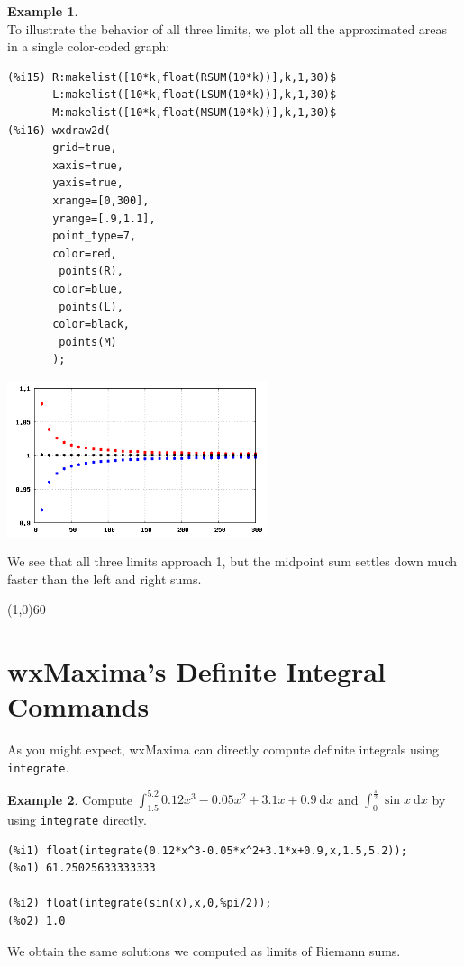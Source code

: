 \documentclass[10.5pt,twoside]{report}
\theoremstyle{definition}
\newtheorem{exmp}{Example}[section]
\begin{document}
\begin{exmp}
${}$\\

To illustrate the behavior of all three limits, we plot all the approximated areas in a single color-coded graph:

\begin{verbatim}
(%i15) R:makelist([10*k,float(RSUM(10*k))],k,1,30)$
       L:makelist([10*k,float(LSUM(10*k))],k,1,30)$
       M:makelist([10*k,float(MSUM(10*k))],k,1,30)$
(%i16) wxdraw2d(
       grid=true,
       xaxis=true,
       yaxis=true,
       xrange=[0,300],
       yrange=[.9,1.1],
       point_type=7,
       color=red,
        points(R),
       color=blue,
        points(L),
       color=black,
        points(M)
       );
\end{verbatim}

\includegraphics[width=3in]{example_6_2_2_1}

We see that all three limits approach 1, but the midpoint sum settles down much faster than the left and right sums.


\end{exmp}

\line(1,0){60}
\linethickness{0.5mm}

\pagebreak

\section{wxMaxima's Definite Integral Commands}\label{wxMaxima's Definite Integral Commands}

As you might expect, wxMaxima can directly compute definite integrals using \verb|integrate|.

\begin{exmp}  Compute $\displaystyle \int_{1.5}^{5.2} 0.12x^3-0.05x^2+3.1x+0.9 \ \mathrm{d}x$ and $\displaystyle \int_{0}^{\frac{\pi}{2}} \sin{x} \ \mathrm{d}x$ by using \verb|integrate| directly.\\

\begin{verbatim}
(%i1) float(integrate(0.12*x^3-0.05*x^2+3.1*x+0.9,x,1.5,5.2));
(%o1) 61.25025633333333

(%i2) float(integrate(sin(x),x,0,%pi/2));
(%o2) 1.0
\end{verbatim}

We obtain the same solutions we computed as limits of Riemann sums.

\end{exmp}
\end{document}
